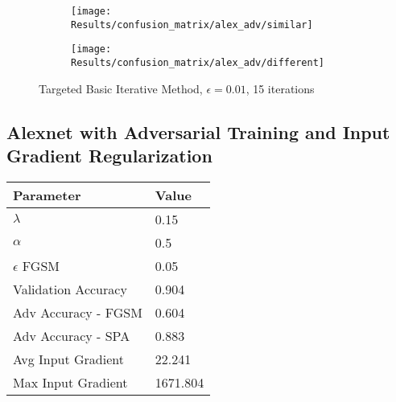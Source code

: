 \documentclass[draft,final]{vutinfth} %
\begin{document}
\begin{figure}[h]
  \begin{subfigure}[b]{0.75\columnwidth}
		\centering
    \texttt{[image: Results/confusion\_matrix/alex\_adv/similar]}
    \label{fig:exp:cm:alex_adv:similar}
  \end{subfigure}
  \begin{subfigure}[b]{0.75\columnwidth}
		\centering
    \texttt{[image: Results/confusion\_matrix/alex\_adv/different]}
    \label{fig:exp:cm:alex_adv:different}
  \end{subfigure}
  \caption{Targeted Basic Iterative Method, $\epsilon = 0.01$, 15 iterations}
  \label{fig:intro} %
\end{figure}


\subsection{Alexnet with Adversarial Training and Input Gradient Regularization}

\begin{table}[h]
  \centering
  \begin{tabular}{ll}
    \toprule
			Parameter			& Value   \\
    \midrule
			$\lambda$								& 0.15		\\
			$\alpha$								& 0.5			\\
			$\epsilon$ FGSM					& 0.05		\\
			
			Validation Accuracy			& 0.904		\\
			Adv Accuracy - FGSM			& 0.604		\\
			Adv Accuracy - SPA			& 0.883		\\
			
			Avg Input Gradient			& 22.241	\\
			Max Input Gradient			& 1671.804\\
    \bottomrule
  \end{tabular}
\end{table}
\end{document}
